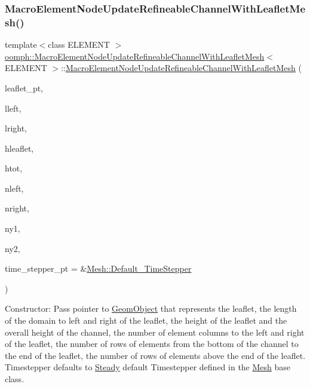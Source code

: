 \subsubsection{\texorpdfstring{Macro\+Element\+Node\+Update\+Refineable\+Channel\+With\+Leaflet\+Mesh()}{MacroElementNodeUpdateRefineableChannelWithLeafletMesh()}}
{\footnotesize\ttfamily template$<$class E\+L\+E\+M\+E\+NT $>$ \\
\hyperlink{classoomph_1_1MacroElementNodeUpdateRefineableChannelWithLeafletMesh}{oomph\+::\+Macro\+Element\+Node\+Update\+Refineable\+Channel\+With\+Leaflet\+Mesh}$<$ E\+L\+E\+M\+E\+NT $>$\+::\hyperlink{classoomph_1_1MacroElementNodeUpdateRefineableChannelWithLeafletMesh}{Macro\+Element\+Node\+Update\+Refineable\+Channel\+With\+Leaflet\+Mesh} (\begin{DoxyParamCaption}\item[{\hyperlink{classoomph_1_1GeomObject}{Geom\+Object} $\ast$}]{leaflet\+\_\+pt,  }\item[{const double \&}]{lleft,  }\item[{const double \&}]{lright,  }\item[{const double \&}]{hleaflet,  }\item[{const double \&}]{htot,  }\item[{const unsigned \&}]{nleft,  }\item[{const unsigned \&}]{nright,  }\item[{const unsigned \&}]{ny1,  }\item[{const unsigned \&}]{ny2,  }\item[{\hyperlink{classoomph_1_1TimeStepper}{Time\+Stepper} $\ast$}]{time\+\_\+stepper\+\_\+pt = {\ttfamily \&\hyperlink{classoomph_1_1Mesh_a12243d0fee2b1fcee729ee5a4777ea10}{Mesh\+::\+Default\+\_\+\+Time\+Stepper}} }\end{DoxyParamCaption})\hspace{0.3cm}{\ttfamily [inline]}}



Constructor\+: Pass pointer to \hyperlink{classoomph_1_1GeomObject}{Geom\+Object} that represents the leaflet, the length of the domain to left and right of the leaflet, the height of the leaflet and the overall height of the channel, the number of element columns to the left and right of the leaflet, the number of rows of elements from the bottom of the channel to the end of the leaflet, the number of rows of elements above the end of the leaflet. Timestepper defaults to \hyperlink{classoomph_1_1Steady}{Steady} default Timestepper defined in the \hyperlink{classoomph_1_1Mesh}{Mesh} base class. 



